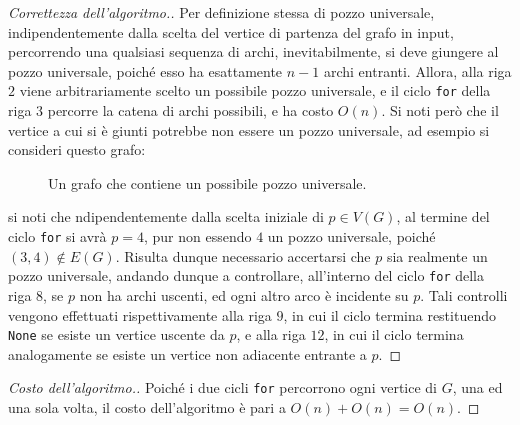 \documentclass[a4paper, 12pt]{report}
\begin{document}
    \begin{proof}[Correttezza dell'algoritmo.]
        Per definizione stessa di pozzo universale, indipendentemente dalla scelta del vertice di partenza del grafo in input, percorrendo una qualsiasi sequenza di archi, inevitabilmente, si deve giungere al pozzo universale, poiché esso ha esattamente $n - 1$ archi entranti. Allora, alla riga $2$ viene arbitrariamente scelto un possibile pozzo universale, e il ciclo \texttt{for} della riga $3$ percorre la catena di archi possibili, e ha costo $O(n)$. Si noti però che il vertice a cui si è giunti potrebbe non essere un pozzo universale, ad esempio si consideri questo grafo:

        \begin{figure}[H]
            \centering
            \caption{Un grafo che contiene un possibile pozzo universale.}
        \end{figure}

        si noti che ndipendentemente dalla scelta iniziale di $p \in V(G)$, al termine del ciclo \texttt{for} si avrà $p = 4$, pur non essendo $4$ un pozzo universale, poiché $(3, 4) \notin E(G)$. Risulta dunque necessario accertarsi che $p$ sia realmente un pozzo universale, andando dunque a controllare, all'interno del ciclo \texttt{for} della riga $8$, se $p$ non ha archi uscenti, ed ogni altro arco è incidente su $p$. Tali controlli vengono effettuati rispettivamente alla riga $9$, in cui il ciclo termina restituendo \texttt{None} se esiste un vertice uscente da $p$, e alla riga $12$, in cui il ciclo termina analogamente se esiste un vertice non adiacente entrante a $p$.
    \end{proof}

    \begin{proof}[Costo dell'algoritmo.]
        Poiché i due cicli \texttt{for} percorrono ogni vertice di $G$, una ed una sola volta, il costo dell'algoritmo è pari a $O(n) + O(n) = O(n)$.
    \end{proof}
\end{document}
